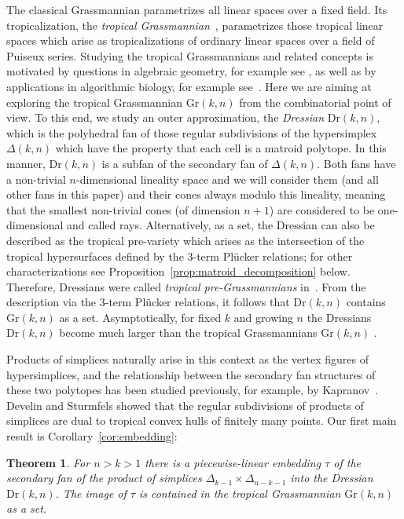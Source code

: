 \documentclass[11pt,a4paper]{amsart}
\newcommand{\Gr}[2]{{\mathrm{Gr}(#1,#2)}}
\newcommand{\Dr}[2]{{\mathrm{Dr}(#1,#2)}}
\theoremstyle{plain}
\newtheorem*{theorem*}{Theorem}
\theoremstyle{definition}
\begin{document}
The classical Grassmannian parametrizes all linear spaces over a fixed field.  Its tropicalization,
the \emph{tropical Grassmannian}~\cite{MR2071813}, parametrizes those tropical linear spaces which
arise as tropicalizations of ordinary linear spaces over a field of Puiseux series.  Studying the
tropical Grassmannians and related concepts is motivated by questions in algebraic geometry, for
example see \cite{HackingKeelTevelev}, as well as by applications in algorithmic biology, for
example see~\cite{ASCB}.  Here we are aiming at exploring the tropical Grassmannian $\Gr{k}{n}$ from
the combinatorial point of view.  To this end, we study an outer approximation, the \emph{Dressian}
$\Dr{k}{n}$, which is the polyhedral fan of those regular subdivisions of the hypersimplex
$\Delta(k,n)$ which have the property that each cell is a matroid polytope.  In this manner,
$\Dr{k}{n}$ is a subfan of the secondary fan of $\Delta(k,n)$. Both fans have a non-trivial
$n$-dimensional lineality space and we will consider them (and all other fans in this paper) and
their cones always modulo this lineality, meaning that the smallest non-trivial cones (of dimension
$n+1$) are considered to be one-dimensional and called rays.  Alternatively, as a set, the Dressian
can also be described as the tropical pre-variety which arises as the intersection of the tropical
hypersurfaces defined by the $3$-term Pl\"ucker relations; for other characterizations see
Proposition~\ref{prop:matroid_decomposition} below. Therefore, Dressians were called \emph{tropical
  pre-Grassmannians} in~\cite{MR2071813}.  From the description via the $3$-term Pl\"ucker
relations, it follows that $\Dr{k}{n}$ contains $\Gr{k}{n}$ as a set.  Asymptotically, for fixed $k$
and growing $n$ the Dressians $\Dr{k}{n}$ become much larger than the tropical Grassmannians
$\Gr{k}{n}$ \cite[Thm.~3.6]{MR2515769}.

Products of simplices naturally arise in this context as the vertex figures of hypersimplices, and
the relationship between the secondary fan structures of these two polytopes has been studied
previously, for example, by Kapranov~\cite[Sec.~1.4]{MR1237834}.  Develin and Sturmfels
\cite[Thm.~1]{DevelinSturmfels04} showed that the regular subdivisions of products of simplices are
dual to tropical convex hulls of finitely many points.  Our first main result is
Corollary~\ref{cor:embedding}:

\begin{theorem*}
  For $n>k>1$ there is a piecewise-linear embedding $\tau$ of the secondary fan of the product of
  simplices $\Delta_{k-1}\times\Delta_{n-k-1}$ into the Dressian $\Dr{k}{n}$.  The image of $\tau$
  is contained in the tropical Grassmannian $\Gr{k}{n}$ as a set.
\end{theorem*}
\end{document}
